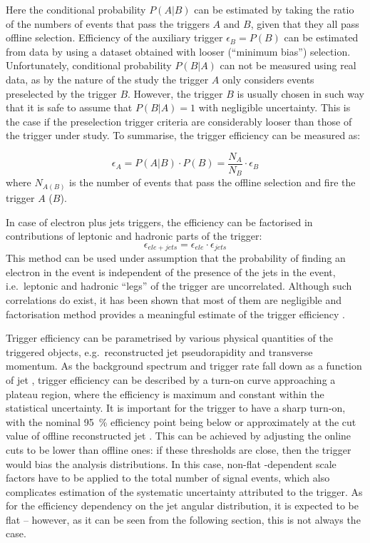 Here the conditional probability $P(A|B)$ can be estimated by taking the ratio of the numbers of events that pass the
triggers $A$ and $B$, given that they all pass offline selection. Efficiency of the auxiliary trigger $\epsilon_{B} =
P(B)$ can be estimated from data by using a dataset obtained with looser (``minimum bias'') selection. Unfortunately,
conditional probability $P(B|A)$ can not be measured using real data, as by the nature of the study the trigger $A$ only
considers events preselected by the trigger $B$. However, the trigger $B$ is usually chosen in such way that it is safe
to assume that $P(B|A) = 1$ with negligible uncertainty. This is the case if the preselection trigger criteria are
considerably looser than those of the trigger under study. To summarise, the trigger efficiency can be measured as:

\begin{equation}
\epsilon_{A} = P(A|B) \cdot P(B) = \frac{N_A}{N_B} \cdot \epsilon_{B}
\end{equation}
where $N_{A (B)}$ is the number of events that pass the offline selection and fire the trigger $A$ ($B$).


In case of electron plus jets triggers, the efficiency can be factorised in contributions of leptonic and hadronic parts
of the trigger:
\begin{equation}
\epsilon_{ele+jets} = \epsilon_{ele} \cdot \epsilon_{jets}
\end{equation}
This method can be used under assumption that the probability of finding an electron in the event is independent of the
presence of the jets in the event, i.e.\ leptonic and hadronic ``legs'' of the trigger are uncorrelated. Although
such correlations do exist, it has been shown that most of them are negligible and factorisation method provides a
meaningful estimate of the trigger efficiency \autocite{d0_note_top_trigger_efficiency}.

Trigger efficiency can be parametrised by various physical quantities of the triggered objects, e.g.\ reconstructed jet
pseudorapidity and transverse momentum. As the background spectrum and trigger rate fall down as a function of jet \pt,
trigger efficiency can be described by a turn-on curve approaching a plateau region, where the efficiency is maximum and
constant within the statistical uncertainty. It is important for the trigger to have a sharp turn-on, with the nominal
\SI{95}{\percent} efficiency point being below or approximately at the cut value of offline reconstructed jet \pt. This
can be achieved by adjusting the online cuts to be lower than offline ones: if these thresholds are close, then the
trigger would bias the analysis distributions. In this case, non-flat \pt-dependent scale factors have to be applied to
the total number of signal events, which also complicates estimation of the systematic uncertainty attributed to the
trigger. As for the efficiency dependency on the jet angular distribution, it is expected to be flat -- however, as it
can be seen from the following section, this is not always the case.

